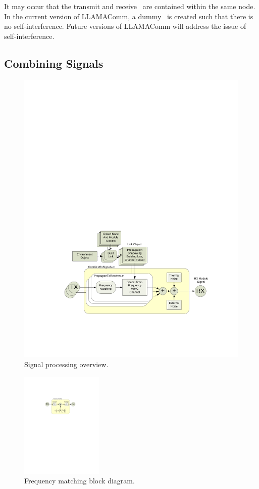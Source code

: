 It may occur that the transmit and receive \module\ are contained within the
same node. In the current version of LLAMAComm, a dummy \link\ is created such
that there is no self-interference. Future versions of LLAMAComm will address
the issue of self-interference.

\subsection{Combining Signals}\label{sec:combineSignal}

%
\begin{figure}[!h]
\centering
\includegraphics[width=6in]{figs/Combine_Rx}
\caption{Signal processing overview.} \label{fig:combinerx}
\end{figure}
%
%
\begin{figure}[!h]
\centering
\includegraphics[height=2in]{figs/Freq_Match}
\caption{Frequency matching block diagram.} \label{fig:freqmatch}
\end{figure}
